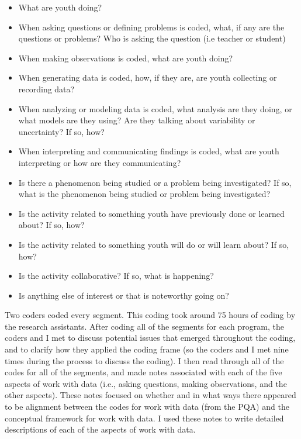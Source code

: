 \documentclass[]{msu-thesis}
\providecommand{\tightlist}{%
  \setlength{\itemsep}{0pt}\setlength{\parskip}{0pt}}
\theoremstyle{definition}
\theoremstyle{definition}
\theoremstyle{definition}
\theoremstyle{remark}
\begin{document}
\begin{itemize}
\tightlist
\item
  What are youth doing?
\item
  When asking questions or defining problems is coded, what, if any are
  the questions or problems? Who is asking the question (i.e teacher or
  student)
\item
  When making observations is coded, what are youth doing?
\item
  When generating data is coded, how, if they are, are youth collecting
  or recording data?
\item
  When analyzing or modeling data is coded, what analysis are they
  doing, or what models are they using? Are they talking about
  variability or uncertainty? If so, how?
\item
  When interpreting and communicating findings is coded, what are youth
  interpreting or how are they communicating?
\item
  Is there a phenomenon being studied or a problem being investigated?
  If so, what is the phenomenon being studied or problem being
  investigated?
\item
  Is the activity related to something youth have previously done or
  learned about? If so, how?
\item
  Is the activity related to something youth will do or will learn
  about? If so, how?
\item
  Is the activity collaborative? If so, what is happening?
\item
  Is anything else of interest or that is noteworthy going on?
\end{itemize}

Two coders coded every segment. This coding took around 75 hours of
coding by the research assistants. After coding all of the segments for
each program, the coders and I met to discuss potential issues that
emerged throughout the coding, and to clarify how they applied the
coding frame (so the coders and I met nine times during the process to
discuss the coding). I then read through all of the codes for all of the
segments, and made notes associated with each of the five aspects of
work with data (i.e., asking questions, making observations, and the
other aspects). These notes focused on whether and in what ways there
appeared to be alignment between the codes for work with data (from the
PQA) and the conceptual framework for work with data. I used these notes
to write detailed descriptions of each of the aspects of work with data.
\end{document}
